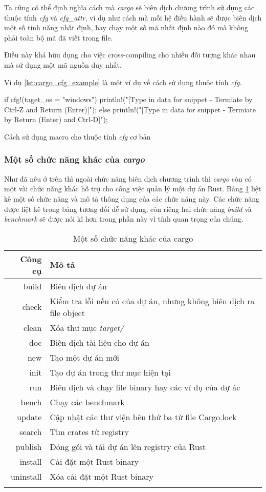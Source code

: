 Ta cũng có thể định nghĩa cách mà \emph{cargo} sẽ biên dịch chương trình sử dụng các thuộc tính \emph{cfg} và \emph{cfg\_attr}, ví dụ như cách mà mỗi hệ điều hành sẽ được biên dịch một số tính năng nhất định, hay chạy một số mã nhất định nào đó mà không phải toàn bộ mã đã viết trong file.

Điều này khá hữu dụng cho việc cross-compiling cho nhiều đối tượng khác nhau mà sử dụng một mã nguồn duy nhất.

Ví dụ \ref{lst:cargo_cfg_example} là một ví dụ về cách sử dụng thuộc tính \emph{cfg}.
\begin{listing}
\begin{rustcode}
if cfg!(taget_os = "windows") {
    println!("[Type in data for snippet - Termiate by Ctrl-Z and Return (Enter)]");
} else {
    println!("[Type in data for snippet - Termiate by Return (Enter) and Ctrl-D]");
}
\end{rustcode}
\caption{Cách sử dụng macro cho thuộc tính \emph{cfg} cơ bản}
\label{lst:cargo_cfg_example}
\end{listing}

\subsubsection{Một số chức năng khác của \emph{cargo}}\label{lbl:cargo_other_features}
Như đã nêu ở trên thì ngoài chức năng biên dịch chương trình thì \emph{cargo} còn có một vài chức năng khác hỗ trợ cho công việc quản lý một dự án Rust.
Bảng \ref{tbl:cargo_other_features} liệt kê một số chức năng và mô tả thông dụng của các chức năng này.
Các chức năng được liệt kê trong bảng tương đối dễ sử dụng, còn riêng hai chức năng \emph{build} và \emph{benchmark} sẽ được nói kĩ hơn trong phần này vì tính quan trọng của chúng.

\begin{longtable}{r|l}
\textbf{Công cụ} & \textbf{Mô tả} \\
\midrule
\endhead
build & Biên dịch dự án \\
check & Kiểm tra lỗi nếu có của dự án, nhưng không biên dịch ra file object \\
clean & Xóa thư mục \emph{target/} \\
doc & Biên dịch tài liệu cho dự án \\
new & Tạo một dự án mới \\
init & Tạo dự án trong thư mục hiện tại \\
run & Biên dịch và chạy file binary hay các ví dụ của dự ác \\
bench & Chạy các benchmark \\
update & Cập nhật các thư viện bên thứ ba từ file Cargo.lock \\
search & Tìm crates từ registry \\
publish & Đóng gói và tải dự án lên registry của Rust \\
install & Cài đặt một Rust binary \\
uninstall & Xóa cài đặt một Rust binary \\
\bottomrule
\caption{Một số chức năng khác của cargo}
\label{tbl:cargo_other_features}
\end{longtable}


